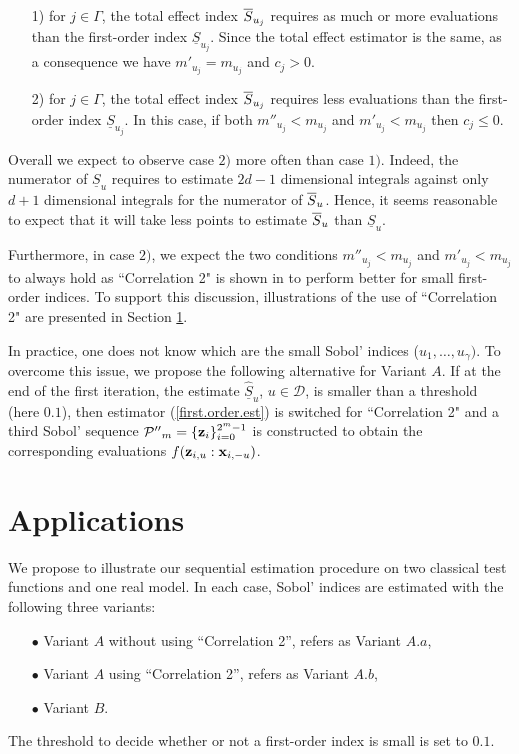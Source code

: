 \begin{itemize}
\item[1)] for $j \in \Gamma$, the total effect index $\ov{$S$}_{u_j}$ requires as much or more evaluations than the first-order index $\underline{S}_{u_j}$. Since the total effect estimator is the same, as a consequence we have $m'_{u_j}=m_{u_j}$ and $c_j >0$.
\item[2)] for $j \in \Gamma$, the total effect index $\ov{$S$}_{u_j}$ requires less evaluations than the first-order index $\underline{S}_{u_j}$. In this case, if both $m''_{u_j} < m_{u_j}$ and $m'_{u_j} < m_{u_j}$ then $c_j \leq 0$.  
\end{itemize}
Overall we expect to observe case $2)$ more often than case $1)$. Indeed, the numerator of $\underline{S}_u$ requires to estimate $2d-1$ dimensional integrals against only $d+1$ dimensional integrals for the numerator of $\ov{$S$}_u$. Hence, it seems reasonable to expect that it will take less points to estimate $\ov{$S$}_u$ than $\underline{S}_u$. 

Furthermore, in case $2)$, we expect the two conditions $m''_{u_j} < m_{u_j}$ and $m'_{u_j} < m_{u_j}$ to always hold as ``Correlation 2" is shown in \cite{Owen} to perform better for small first-order indices. To support this discussion, illustrations of the use of ``Correlation 2" are presented in Section \ref{sec:5}. 

In practice, one does not know which are the small Sobol' indices ($u_1,\dots,u_\gamma)$. To overcome this issue, we propose the following alternative for Variant $A$. If at the end of the first iteration, the estimate $\widehat{\underline{S}}_u$, $u \in \mathcal{D}$, is smaller than a threshold (here $0.1$), then estimator (\ref{first.order.est}) is switched for ``Correlation 2" and a third Sobol' sequence $\mathcal{P''}_{m}=\{\boldsymbol{\mathbf{z}}_i\}_{i=0}^{2^m-1}$ is constructed to obtain the corresponding evaluations $f({\boldsymbol{\mathbf{z}}}_{i,u}:{\boldsymbol{\mathbf{x}}}_{i,-u})$.

\section{Applications}
\label{sec:5}

We propose to illustrate our sequential estimation procedure on two classical test functions and one real model. In each case, Sobol' indices are estimated with the following three variants:
\begin{itemize}
\item[$\bullet$] Variant $A$ without using ``Correlation 2'', refers as Variant $A.a$, 
\item[$\bullet$] Variant $A$ using ``Correlation 2'', refers as Variant $A.b$,
\item[$\bullet$] Variant $B$.
\end{itemize}
The threshold to decide whether or not a first-order index is small is set to $0.1$. 

